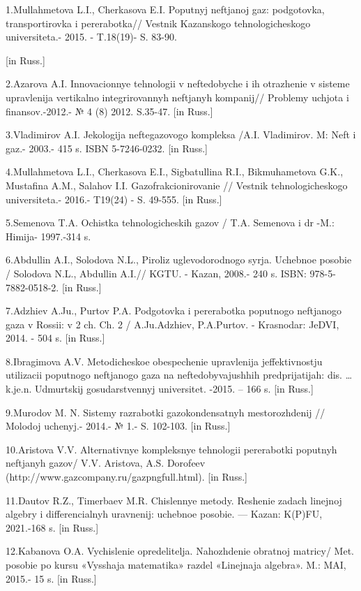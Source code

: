 \begin{noparindent}
1.Mullahmetova L.I., Cherkasova E.I. Poputnyj neftjanoj gaz: podgotovka,
transportirovka i pererabotka// Vestnik Kazanskogo tehnologicheskogo
universiteta.- 2015. - T.18(19)- S. 83-90.

{[}in Russ.{]}

2.Azarova A.I. Innovacionnye tehnologii v neftedobyche i ih otrazhenie v
sisteme upravlenija vertikal\textquotesingle no integrirovannyh
neftjanyh kompanij// Problemy uchjota i finansov.-2012.- № 4 (8) 2012.
S.35-47. {[}in Russ.{]}

3.Vladimirov A.I. Jekologija neftegazovogo kompleksa /A.I. Vladimirov.
M: Neft\textquotesingle{} i gaz.- 2003.- 415 s. ISBN 5-7246-0232. {[}in
Russ.{]}

4.Mullahmetova L.I., Cherkasova E.I., Sigbatullina R.I., Bikmuhametova
G.K., Mustafina A.M., Salahov I.I. Gazofrakcionirovanie // Vestnik
tehnologicheskogo universiteta.- 2016.- T19(24) - S. 49-555. {[}in
Russ.{]}

5.Semenova T.A. Ochistka tehnologicheskih gazov / T.A. Semenova i dr
-M.: Himija- 1997.-314 s.

6.Abdullin A.I., Solodova N.L., Piroliz uglevodorodnogo
syr\textquotesingle ja. Uchebnoe posobie / Solodova N.L., Abdullin
A.I.// KGTU. - Kazan\textquotesingle, 2008.- 240 s. ISBN:
978-5-7882-0518-2. {[}in Russ.{]}

7.Adzhiev A.Ju., Purtov P.A. Podgotovka i pererabotka poputnogo
neftjanogo gaza v Rossii: v 2 ch. Ch. 2 / A.Ju.Adzhiev, P.A.Purtov. -
Krasnodar: JeDVI, 2014. - 504 s. {[}in Russ.{]}

8.Ibragimova A.V. Metodicheskoe obespechenie upravlenija
jeffektivnost\textquotesingle ju utilizacii poputnogo neftjanogo gaza na
neftedobyvajushhih predprijatijah: dis. \ldots{} k.je.n. Udmurtskij
gosudarstvennyj universitet. -2015. -- 166 s. {[}in Russ.{]}

9.Murodov M. N. Sistemy razrabotki gazokondensatnyh mestorozhdenij //
Molodoj uchenyj.- 2014.- № 1.- S. 102-103. {[}in Russ.{]}

10.Aristova V.V. Al\textquotesingle ternativnye kompleksnye tehnologii
pererabotki poputnyh neftjanyh gazov/ V.V. Aristova, A.S. Dorofeev
(http://www.gazcompany.ru/gazpngfull.html). {[}in Russ.{]}

11.Dautov R.Z., Timerbaev M.R. Chislennye metody. Reshenie zadach
linejnoj algebry i differencial\textquotesingle nyh uravnenij: uchebnoe
posobie. --- Kazan\textquotesingle: K(P)FU, 2021.-168 s. {[}in Russ.{]}

12.Kabanova O.A. Vychislenie opredelitelja. Nahozhdenie obratnoj
matricy/ Met. posobie po kursu «Vysshaja matematika» razdel «Linejnaja
algebra». M.: MAI, 2015.- 15 s. {[}in Russ.{]}
\end{noparindent}

